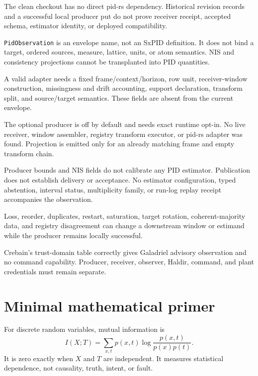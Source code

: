 \documentclass[11pt]{article}
\begin{document}
\begin{description}[style=nextline,font=\bfseries]
\item[Provenance] The clean checkout has no direct pid-rs dependency.  Historical
revision records and a successful local producer put do not prove receiver
receipt, accepted schema, estimator identity, or deployed compatibility.
\item[SxPID estimand compatibility] \texttt{PidObservation} is an envelope name,
not an SxPID definition.  It does not bind a target, ordered sources, measure,
lattice, units, or atom semantics.  NIS and consistency projections cannot be
transplanted into PID quantities.
\item[Mathematical assumptions] A valid adapter needs a fixed
frame/context/horizon, row unit, receiver-window construction, missingness and
drift accounting, support declaration, transform split, and source/target
semantics.  These fields are absent from the current envelope.
\item[Implementation and API] The optional producer is off by default and needs
exact runtime opt-in.  No live receiver, window assembler, registry transform
executor, or pid-rs adapter was found.  Projection is emitted only for an
already matching frame and empty transform chain.
\item[Numerical and statistical validity] Producer bounds and NIS fields do not
calibrate any PID estimator.  Publication does not establish delivery or acceptance.  No
estimator configuration, typed abstention, interval status, multiplicity
family, or run-log replay receipt accompanies the observation.
\item[Adversarial and operational misuse] Loss, reorder, duplicates, restart,
saturation, target rotation, coherent-majority data, and registry disagreement
can change a downstream window or estimand while the producer remains locally
successful.
\item[Authority] Crebain's trust-domain table correctly gives Galadriel advisory
observation and no command capability.  Producer, receiver, observer, Haldir,
command, and plant credentials must remain separate.
\end{description}

\section{Minimal mathematical primer}

For discrete random variables, mutual information is
\begin{equation}
 I(X;T)=\sum_{x,t}p(x,t)\log\frac{p(x,t)}{p(x)p(t)}.
\end{equation}
It is zero exactly when $X$ and $T$ are independent.  It measures statistical
dependence, not causality, truth, intent, or fault.
\end{document}
